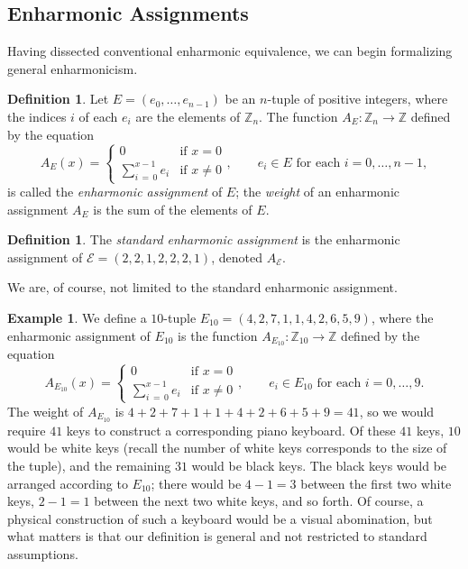 \documentclass{article}
\theoremstyle{plain}
\theoremstyle{definition}
\newtheorem{definition}[theorem]{Definition}
\newtheorem{example}[theorem]{Example}
\theoremstyle{remark}
\begin{document}
\subsection{Enharmonic Assignments}
\label{SSEC.Enharmonic Assignments}

Having dissected conventional enharmonic equivalence, we can begin formalizing general enharmonicism.

\begin{definition}
	Let $E=(e_0,\dots,e_{n-1})$ be an $n$-tuple of positive integers, where the indices $i$ of each $e_i$ are the elements of $\mathbb{Z}_n$. The function $A_E:\mathbb{Z}_{n}\to\mathbb{Z}$ defined by the equation $$A_E(x)=\begin{cases} 0 & \textrm{if }x=0 \\ \sum_{i\,=\,0}^{x-1}e_i & \textrm{if }x\ne 0 \end{cases},\qquad e_i\in E\textrm{ for each }i=0,\dots,n-1,$$ is called the \textit{enharmonic assignment} of $E$; the \textit{weight} of an enharmonic assignment $A_E$ is the sum of the elements of $E$.
\end{definition}

\begin{definition}
	The \textit{standard enharmonic assignment} is the enharmonic assignment of $\mathcal{E}=(2,2,1,2,2,2,1)$, denoted $A_\mathcal{E}$.
\end{definition}

We are, of course, not limited to the standard enharmonic assignment.

\begin{example}
	We define a $10$-tuple $E_{10}=(4,2,7,1,1,4,2,6,5,9)$, where the enharmonic assignment of $E_{10}$ is the function $A_{E_{10}}:\mathbb{Z}_{10}\to\mathbb{Z}$ defined by the equation $$A_{E_{10}}(x)=\begin{cases} 0 & \textrm{if }x=0 \\ \sum_{i\,=\,0}^{x-1}e_i & \textrm{if }x\ne 0 \end{cases},\qquad e_i\in E_{10}\textrm{ for each }i=0,\dots,9.$$ The weight of $A_{E_{10}}$ is $4+2+7+1+1+4+2+6+5+9=41$, so we would require $41$ keys to construct a corresponding piano keyboard. Of these $41$ keys, $10$ would be white keys (recall the number of white keys corresponds to the size of the tuple), and the remaining $31$ would be black keys. The black keys would be arranged according to $E_{10}$; there would be $4-1=3$ between the first two white keys, $2-1=1$ between the next two white keys, and so forth. Of course, a physical construction of such a keyboard would be a visual abomination, but what matters is that our definition is general and not restricted to standard assumptions.
\end{example}
\end{document}
